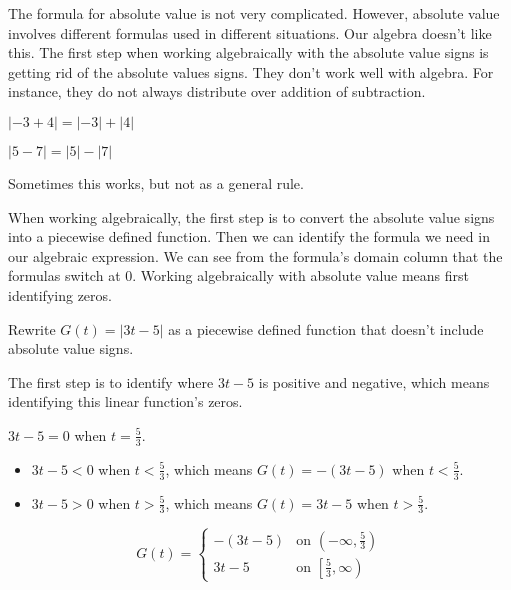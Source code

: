 \documentclass{ximera}
\begin{document}
The formula for absolute value is not very complicated.  However, absolute value involves different formulas used in different situations.  Our algebra doesn't like this. The first step when working algebraically with the absolute value signs is getting rid of the absolute values signs.  They don't work well with algebra. For instance, they do not always distribute over addition of subtraction.


\begin{question}
$| -3 + 4 | = | -3 | + | 4 |$
  \begin{multipleChoice}
  \end{multipleChoice}
\end{question}


\begin{question}
$| 5 - 7 | = | 5 | - | 7 |$
  \begin{multipleChoice}
  \end{multipleChoice}
\end{question}


Sometimes this works, but not as a general rule.


When working algebraically, the first step is to convert the absolute value signs into a piecewise defined function. Then we can identify the formula we need in our algebraic expression.  We can see from the formula's domain column that the formulas switch at $0$. Working algebraically with absolute value means first identifying zeros.



\begin{example}


Rewrite $G(t) = | 3t - 5 |$ as a piecewise defined function that doesn't include absolute value signs.


\begin{explanation}
The first step is to identify where $3t - 5$ is positive and negative, which means identifying this linear function's zeros.



$3t-5=0$ when $t=\frac{5}{3}$.


\begin{itemize}
\item $3t - 5 < 0$ when $t<\tfrac{5}{3}$, which means $G(t) = -(3t - 5)$ when $t<\tfrac{5}{3}$.
\item $3t - 5 > 0$ when $t>\tfrac{5}{3}$, which means $G(t) = 3t - 5$ when $t>\tfrac{5}{3}$.
\end{itemize}





\[
G(t) = 
\begin{cases}
  -(3t-5) &\text{on $\left( -\infty, \tfrac{5}{3} \right)$} \\
  3t-5 &\text{on $\left[ \tfrac{5}{3}, \infty \right)$}
\end{cases}
\]

\end{explanation}




\end{example}
\end{document}
